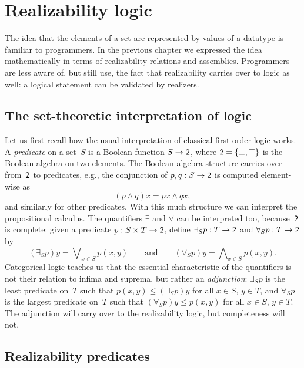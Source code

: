 \chapter{Realizability logic}
\label{sec:realizability-interpretation}

The idea that the elements of a set are represented by values of a datatype is familiar to programmers. In the previous chapter we expressed the idea mathematically in terms of realizability relations and assemblies. Programmers are less aware of, but still use, the fact that realizability carries over to logic as well: a logical statement can be validated by realizers.

\section{The set-theoretic interpretation of logic}
\label{sec:interpr-logic-set-theoretic}

Let us first recall how the usual interpretation of classical
first-order logic works.
%
A \emph{predicate} on a set~$S$ is a Boolean function $S \to \mathsf{2}$, where $\mathsf{2} = \{\bot, \top\}$ is the Boolean algebra on two elements. The Boolean algebra structure carries over from~$\mathsf{2}$ to predicates, e.g., the conjunction of $p, q : S \to \mathsf{2}$ is computed element-wise as
%
\begin{equation*}
  (p \land q) x = p x \land q x,
\end{equation*}
%
and similarly for other predicates. With this much structure we can interpret the propositional calculus. The quantifiers $\exists$ and $\forall$ can be interpreted too, because~$\mathsf{2}$ is complete: given a predicate $p : S \times T \to \mathsf{2}$, define $\exists_S p : T \to \mathsf{2}$ and $\forall_S p : T \to \mathsf{2}$ by
%
\begin{equation*}
  (\exists_S p) y = \bigvee\nolimits_{x \in S} p(x, y)
  \qquad\text{and}\qquad
  (\forall_S p) y = \bigwedge\nolimits_{x \in S} p(x, y).
\end{equation*}
%
Categorical logic teaches us that the essential characteristic of the quantifiers is not their relation to infima and suprema, but rather an \emph{adjunction}: $\exists_S p$ is the least predicate on~$T$ such that $p(x, y) \leq (\exists_S p) y$ for all $x \in S$, $y \in T$, and $\forall_S p$ is the largest predicate on~$T$ such that $(\forall_S p) y \leq p(x, y)$ for all $x \in S$, $y \in T$. The adjunction will carry over to the realizability logic, but completeness will not.


\section{Realizability predicates}
\label{sec:realizability-predicates}

